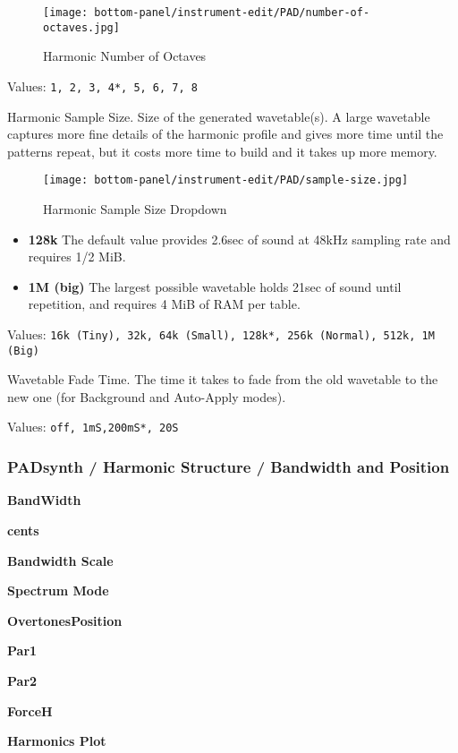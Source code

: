 \begin{figure}[H]
   \centering
   \texttt{[image: bottom-panel/instrument-edit/PAD/number-of-octaves.jpg]}
   \caption{Harmonic Number of Octaves}
   \label{fig:padsynth_harmonic_number_of_octaves}
\end{figure}

   Values: \texttt{1, 2, 3, 4*, 5, 6, 7, 8}

   Harmonic Sample Size.
   Size of the generated wavetable(s). A large wavetable captures more fine
   details of the harmonic profile and gives more time until the patterns repeat,
   but it costs more time to build and it takes up more memory.

\begin{figure}[H]
   \centering
   \texttt{[image: bottom-panel/instrument-edit/PAD/sample-size.jpg]}
   \caption{Harmonic Sample Size Dropdown}
   \label{fig:padsynth_harmonic_sample_size_dropdown}
\end{figure}

   \begin{itemize}
      \item \textbf{128k}
         The default value provides 2.6sec of sound at 48kHz sampling rate and
         requires 1/2 MiB.
      \item \textbf{1M (big)}
         The largest possible wavetable holds 21sec of sound until repetition, and
         requires 4 MiB of RAM per table.
   
   \end{itemize}

   Values: \texttt{16k (Tiny), 32k, 64k (Small), 128k*, 256k (Normal), 512k, 1M
   (Big)}

   Wavetable Fade Time.
   The time it takes to fade from the old wavetable to the new one (for Background
   and Auto-Apply modes).

   Values: \texttt{off, 1mS,200mS*, 20S}

\subsubsection{PADsynth / Harmonic Structure / Bandwidth and Position}
\label{subsubsec:padsynth_harmonic_structure_bw_and_pos}

   \begin{enumber}
      \item \textbf{BandWidth}
      \item \textbf{cents}
      \item \textbf{Bandwidth Scale}
      \item \textbf{Spectrum Mode}
      \item \textbf{OvertonesPosition}
      \item \textbf{Par1}
      \item \textbf{Par2}
      \item \textbf{ForceH}
      \item \textbf{Harmonics Plot}
   \end{enumber}

